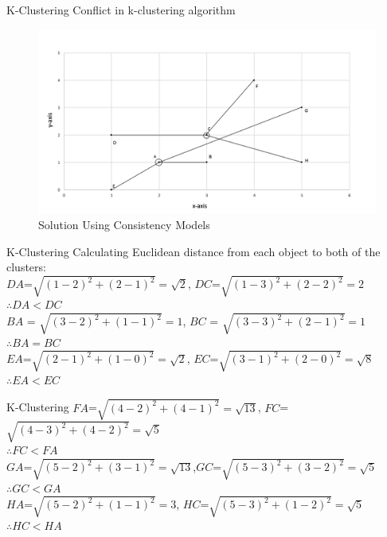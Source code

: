 \begin{frame}{K-Clustering}
	Conflict in k-clustering algorithm
			\begin{figure}
			\includegraphics[width=0.8\linewidth]{figures/kcluster1.jpg}
			\caption{Solution Using Consistency Models}
			\end{figure}
\end{frame}

\begin{frame}{K-Clustering}
  Calculating Euclidean distance from each object to both of the clusters:\\
  $DA$=$\sqrt{{(1-2)}^2+{(2-1)}^2}=\sqrt{2}$,
  $DC$=$\sqrt{{(1-3)}^2+{(2-2)}^2}=2$\\
  $\therefore DA<DC$\\
  $BA$ = $\sqrt{{(3-2)}^2+{(1-1)}^2}=1$,
  $BC$ = $\sqrt{{(3-3)}^2+{(2-1)}^2}=1$\\
  $\therefore BA=BC$\\
  $EA$=$\sqrt{{(2-1)}^2+{(1-0)}^2}=\sqrt{2}$,
  $EC$=$\sqrt{{(3-1)}^2+{(2-0)}^2}=\sqrt{8}$\\
  $\therefore EA<EC$\\
\end{frame}

\begin{frame}{K-Clustering}
  $FA$=$\sqrt{{(4-2)}^2+{(4-1)}^2}=\sqrt{13}$,
  $FC$=$\sqrt{{(4-3)}^2+{(4-2)}^2}=\sqrt{5}$\\
  $\therefore FC<FA$\\
  $GA$=$\sqrt{{(5-2)}^2+{(3-1)}^2}=\sqrt{13}$,$GC$=$\sqrt{{(5-3)}^2+{(3-2)}^2}=\sqrt{5}$\\
  $\therefore GC<GA$\\
  $HA$=$\sqrt{{(5-2)}^2+{(1-1)}^2}=3$,
  $HC$=$\sqrt{{(5-3)}^2+{(1-2)}^2}=\sqrt{5}$\\
  $\therefore HC<HA$\\
\end{frame}

